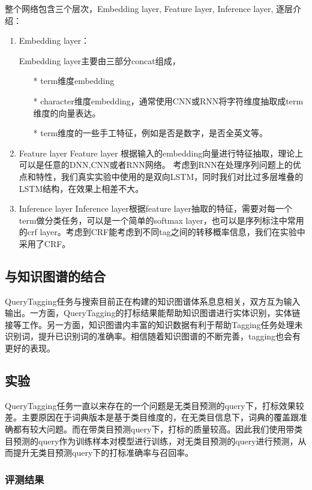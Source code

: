 整个网络包含三个层次，Embedding layer, Feature layer, Inference layer, 逐层介绍：
\begin{enumerate}
\item Embedding layer：

Embedding layer主要由三部分concat组成，
\begin{itemize}
\item[*] term维度embedding
\item[*] character维度embedding，通常使用CNN或RNN将字符维度抽取成term维度的向量表达。
\item[*] term维度的一些手工特征，例如是否是数字，是否全英文等。
\end{itemize}
\item Feature layer
Feature layer 根据输入的embedding向量进行特征抽取，理论上可以是任意的DNN,CNN或者RNN网络。
考虑到RNN在处理序列问题上的优点和特性，我们真实实验中使用的是双向LSTM，同时我们对比过多层堆叠的LSTM结构，在效果上相差不大。
\item Inference layer
Inference layer根据feature layer抽取的特征，需要对每一个term做分类任务，可以是一个简单的softmax layer，也可以是序列标注中常用的crf layer。考虑到CRF能考虑到不同tag之间的转移概率信息，我们在实验中采用了CRF。
\end{enumerate}


\subsection{与知识图谱的结合}

QueryTagging任务与搜索目前正在构建的知识图谱体系息息相关，双方互为输入输出。一方面，QueryTagging的打标结果能帮助知识图谱进行实体识别，实体链接等工作。另一方面，知识图谱内丰富的知识数据有利于帮助Tagging任务处理未识别词，提升已识别词的准确率。相信随着知识图谱的不断完善，tagging也会有更好的表现。


\subsection{实验}

QueryTagging任务一直以来存在的一个问题是无类目预测的query下，打标效果较差。主要原因在于词典版本是基于类目维度的，在无类目信息下，词典的覆盖跟准确都有较大问题。而在带类目预测query下，打标的质量较高。因此我们使用带类目预测的query作为训练样本对模型进行训练，对无类目预测的query进行预测，从而提升无类目预测query下的打标准确率与召回率。

\subsubsection{评测结果}

